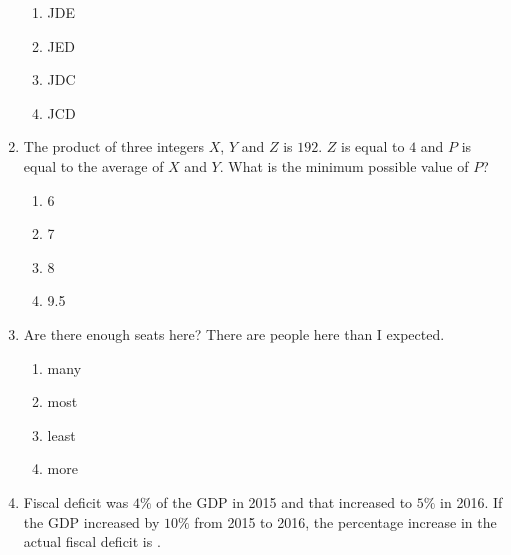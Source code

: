 \documentclass[journal,12pt,onecolumn]{IEEEtran}
\begin{document}
\begin{enumerate}[label=\arabic*)]
\vspace{0.2cm}
\begin{enumerate}[label=\alph*)]
\item JDE
\item JED
\item JDC
\item JCD
\end{enumerate}

\vspace{0.5cm}

\item The product of three integers $X$, $Y$ and $Z$ is $192$. $Z$ is equal to $4$ and $P$ is equal to the average of $X$ and $Y$. What is the minimum possible value of $P$?
\hfill{} \\

\vspace{0.2cm}
\begin{enumerate}[label=\alph*)]
\item 6
\item 7
\item 8
\item 9.5
\end{enumerate}

\vspace{0.5cm}

\item Are there enough seats here? There are \underline{\hspace{2cm}} people here than I expected.
\hfill{} \\

\vspace{0.2cm}
\begin{enumerate}[label=\alph*)]
\item many
\item most
\item least
\item more
\end{enumerate}

\vspace{0.5cm}

\item Fiscal deficit was $4\%$ of the GDP in 2015 and that increased to $5\%$ in 2016. If the GDP increased by $10\%$ from 2015 to 2016, the percentage increase in the actual fiscal deficit is \underline{\hspace{2cm}}.
\vspace{0.2cm}
\hfill{} \\


\end{enumerate}
\end{document}
